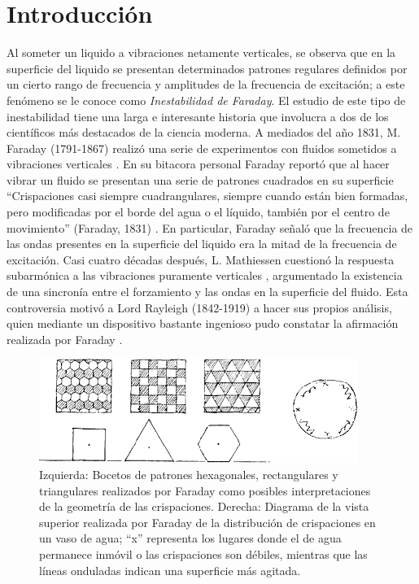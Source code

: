 \chapter*{Introducción}

Al someter un liquido a vibraciones netamente verticales, se observa que en la superficie del liquido se presentan determinados patrones regulares definidos por un cierto rango de frecuencia y amplitudes de la frecuencia de excitación; a este fenómeno se le conoce como \textit{Inestabilidad de Faraday}. El estudio de este tipo de inestabilidad tiene una larga e interesante historia que involucra a dos de los científicos más destacados de la ciencia moderna. A mediados del año 1831, M. Faraday (1791-1867) realizó una serie de experimentos con fluidos sometidos a vibraciones verticales \cite{Faraday1831}. En su bitacora personal Faraday reportó que al hacer vibrar un fluido se presentan una serie de patrones cuadrados en su superficie ``Crispaciones casi siempre cuadrangulares, siempre cuando están bien formadas, pero modificadas por el borde del agua o el líquido, también por el centro de movimiento'' (Faraday, 1831) \cite{Martin1832}. En particular, Faraday señaló que la frecuencia de las ondas presentes en la superficie del liquido era la mitad de la frecuencia de excitación. Casi cuatro décadas después, L. Mathiessen cuestionó la respuesta subarmónica a las vibraciones puramente verticales \cite{Matthiessen1868}, argumentado la existencia de una sincronía entre el forzamiento y las ondas en la superficie del fluido. Esta controversia motivó a Lord Rayleigh (1842-1919) a hacer sus propios análisis, quien mediante un dispositivo bastante ingenioso pudo constatar la afirmación realizada por Faraday \cite{Rayleigh1883b}.\medskip

\begin{figure}
\includegraphics[scale=1]{figuras/faradaysketch.png}
\caption{Izquierda: Bocetos de patrones hexagonales, rectangulares y triangulares realizados por Faraday como posibles interpretaciones de la geometría de las crispaciones. Derecha: Diagrama de la vista superior realizada por Faraday de la distribución de crispaciones en un vaso de agua; ``x'' representa los lugares donde el de agua permanece inmóvil o las crispaciones son débiles, mientras que las líneas onduladas indican una superficie más agitada.\cite{Martin1832}} %
\end{figure}

